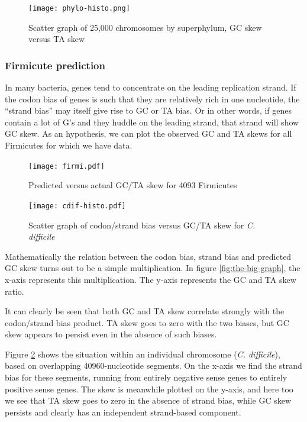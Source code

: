 \documentclass[fleqn,10pt]{wlscirep}
\begin{document}
\begin{figure}[ht]
\centering
\texttt{[image: phylo-histo.png]}
\caption{Scatter graph of 25,000 chromosomes by superphylum, GC skew versus TA skew}
\label{fig:gc-ta-scatter}
\end{figure}


\subsubsection*{Firmicute prediction}
In many bacteria, genes tend to concentrate on the leading replication strand. If the codon bias of genes is such that they are relatively rich in one nucleotide, the ``strand bias'' may itself give rise to GC or TA bias. Or in other words, if genes contain a lot of G's and they huddle on the leading strand, that strand will show GC skew. As an hypothesis, we can plot the observed GC and TA skews for all Firmicutes for which we have data.

\begin{figure}[ht]
  \centering
    \begin{minipage}[b]{0.45\linewidth}
      \texttt{[image: firmi.pdf]}
      \caption{Predicted versus actual GC/TA skew for 4093 Firmicutes}
      \label{fig:the-big-graph}
    \end{minipage}
    \quad
    \begin{minipage}[b]{0.45\linewidth}
      \texttt{[image: cdif-histo.pdf]}
      \caption{Scatter graph of codon/strand bias versus GC/TA skew for \emph{C. difficile}}
      \label{fig:cdif-scatter}
    \end{minipage}
\end{figure}


Mathematically the relation between the codon bias, strand bias and predicted GC skew turns out to be a simple multiplication. In figure \ref{fig:the-big-graph}, the x-axis represents this multiplication. The y-axis represents the GC and TA skew ratio. 

It can clearly be seen that both GC and TA skew correlate strongly with the codon/strand bias product. TA skew goes to zero with the two biases, but GC skew appears to persist even in the absence of such biases.

Figure \ref{fig:cdif-scatter} shows the situation within an individual chromosome (\emph{C. difficile}), based on overlapping 40960-nucleotide segments. On the x-axis we find the strand bias for these segments, running from entirely negative sense genes to entirely positive sense genes. The skew is meanwhile plotted on the y-axis, and here too we see that TA skew goes to zero in the absence of strand bias, while GC skew persists and clearly has an independent strand-based component.
\end{document}
